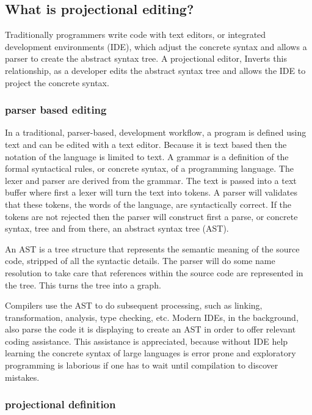 \subsection{What is projectional editing?}\label{section:WhatIsPE}

Traditionally programmers write code with text editors, or integrated development environments (IDE), which adjust the concrete syntax and allows a parser to create the abstract syntax tree.
A projectional editor, Inverts this relationship, as a developer edits the abstract syntax tree and allows the IDE to project the concrete syntax.

\subsubsection{parser based editing}


In a traditional, parser-based, development workflow, a program is defined using text and can be edited with a text editor.
Because it is text based then the notation of the language is limited to text.
A grammar is a definition of the formal syntactical rules, or concrete syntax, of a programming language.
The lexer and parser are derived from the grammar.
The text is passed into a text buffer where first a lexer will turn the text into tokens. 
A parser will validates that these tokens, the words of the language, are syntactically correct.
If the tokens are not rejected then the parser will construct first a parse, or concrete syntax, tree and from there, an abstract syntax tree (AST).

An AST is a tree structure that represents the semantic meaning of the source code, stripped of all the syntactic details.
The parser will do some name resolution to take care that references within the source code are represented in the tree. 
This turns the tree into a graph.

Compilers use the AST to do subsequent processing, such as linking, transformation, analysis, type checking, etc.
Modern IDEs, in the background, also parse the code it is displaying to create an AST in order to offer relevant coding assistance.
This assistance is appreciated, because without IDE help learning the concrete syntax of large languages is error prone and exploratory programming is laborious if one has to wait until compilation to discover mistakes.


\subsubsection{projectional definition}

